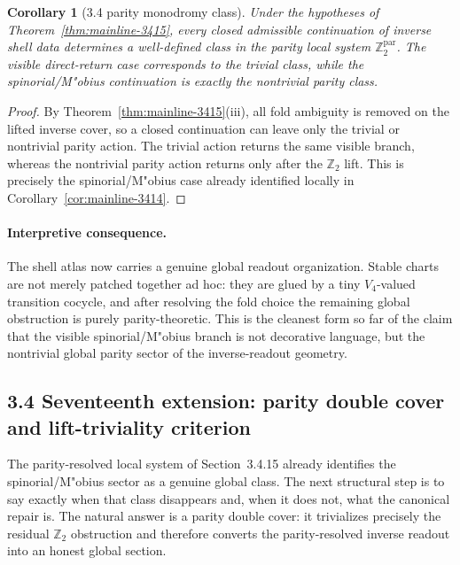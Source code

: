 \documentclass[12pt,a4paper]{article}
\newtheorem{corollary}[theorem]{Corollary}
\begin{document}
\begin{corollary}[3.4 parity monodromy class]
\label{cor:mainline-3415}
Under the hypotheses of Theorem~\ref{thm:mainline-3415}, every closed admissible continuation of inverse shell data determines a well-defined class in the parity local system $\mathbb Z_2^{\mathrm{par}}$. The visible direct-return case corresponds to the trivial class, while the spinorial/M"obius continuation is exactly the nontrivial parity class.
\end{corollary}

\begin{proof}
By Theorem~\ref{thm:mainline-3415}(iii), all fold ambiguity is removed on the lifted inverse cover, so a closed continuation can leave only the trivial or nontrivial parity action. The trivial action returns the same visible branch, whereas the nontrivial parity action returns only after the $\mathbb Z_2$ lift. This is precisely the spinorial/M"obius case already identified locally in Corollary~\ref{cor:mainline-3414}.
\end{proof}

\paragraph{Interpretive consequence.}
The shell atlas now carries a genuine global readout organization. Stable charts are not merely patched together ad hoc: they are glued by a tiny $V_4$-valued transition cocycle, and after resolving the fold choice the remaining global obstruction is purely parity-theoretic. This is the cleanest form so far of the claim that the visible spinorial/M"obius branch is not decorative language, but the nontrivial global parity sector of the inverse-readout geometry.




\subsection*{3.4 Seventeenth extension: parity double cover and lift-triviality criterion}
The parity-resolved local system of Section~3.4.15 already identifies the spinorial/M"obius sector as a genuine global class. The next structural step is to say exactly when that class disappears and, when it does not, what the canonical repair is. The natural answer is a parity double cover: it trivializes precisely the residual $\mathbb Z_2$ obstruction and therefore converts the parity-resolved inverse readout into an honest global section.
\end{document}
